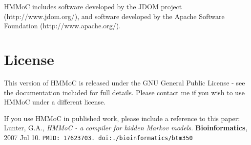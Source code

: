 \documentclass{article}
\begin{document}
HMMoC includes software developed by the JDOM project (http://www.jdom.org/),
and software developed by the Apache Software Foundation (http://www.apache.org/).

\section{License}

This version of HMMoC is released under the GNU General Public License - see the documentation included for
full details.  Please contact me if you wish to use HMMoC under a different license.

If you use HMMoC in published work, please include a reference to this paper:
Lunter, G.A., {\it HMMoC - a compiler for hidden Markov models.}  {\bf Bioinformatics}, 2007 Jul 10.
{\tt PMID: 17623703. doi:./\-bioinformatics/\-btm350}
\end{document}
